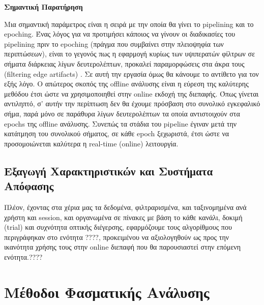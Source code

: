 \documentclass[11pt,a4paper,english,greek,twoside]{../Thesis}
\begin{document}
\textbf{Σημαντική Παρατήρηση}
\par Μια σημαντική παράμετρος είναι η σειρά με την οποία θα γίνει το pipelining και το epoching. Ένας λόγος για να προτιμήσει κάποιος να γίνουν οι διαδικασίες του pipelining πριν το epoching (πράγμα που συμβαίνει στην πλειοψηφία των περιπτώσεων), είναι το γεγονός πως η εφαρμογή κυρίως των υψιπερατών φίλτρων σε σήματα διάρκειας λίγων δευτερολέπτων, προκαλεί παραμορφώσεις στα άκρα τους (filtering edge artifacts) \cite{noauthor_undated-rl}\cite{Luck2014-mg}. Σε αυτή την εργασία όμως θα κάνουμε το αντίθετο για τον εξής λόγο. Ο απώτερος σκοπός της offline ανάλυσης είναι η εύρεση της καλύτερης μεθόδου έτσι ώστε να χρησιμοποιηθεί στην online εκδοχή της διεπαφής. Όπως γίνεται αντιληπτό, σ' αυτήν την περίπτωση δεν θα έχουμε πρόσβαση στο συνολικό εγκεφαλικό σήμα, παρά μόνο σε παράθυρα λίγων δευτερολέπτων τα οποία αντιστοιχούν στα epochs της offline ανάλυσης. Συνεπώς τα στάδια του pipeline έγιναν μετά την κατάτμηση του συνολικού σήματος, σε κάθε epoch ξεχωριστά, έτσι ώστε να προσομοιώνεται καλύτερα η real-time (online) λειτουργία.

\subsection{Εξαγωγή Χαρακτηριστικών και Συστήματα Απόφασης}
\label{subsec:featureExtract}
\par Πλέον, έχοντας στα χέρια μας τα δεδομένα, φιλτραρισμένα, και ταξινομημένα ανά χρήστη και session, και οργανωμένα σε πίνακες με βάση το κάθε κανάλι, δοκιμή (trial) και συχνότητα οπτικής διέγερσης, εφαρμόζουμε τους αλγορίθμους που περιγράφηκαν στο ενότητα ????, προκειμένου να αξιολογηθούν ως προς την ικανότητα χρήσης τους στην online διεπαφή που θα παρουσιαστεί στην επόμενη ενότητα.????

\section{Μέθοδοι Φασματικής Ανάλυσης}
\end{document}

